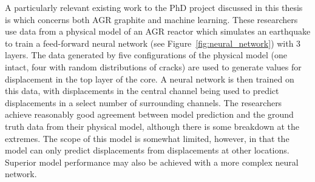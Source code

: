 \noindent
A particularly relevant existing work to the PhD project discussed in this thesis is \cite{dihoru2018neural} which concerns both AGR graphite and machine learning. These researchers use data from a physical model of an AGR reactor which simulates an earthquake to train a feed-forward neural network (see Figure~\ref{fig:neural_network}) with 3 layers. The data generated by five configurations of the physical model (one intact, four with random distributions of cracks) are used to generate values for displacement in the top layer of the core. A neural network is then trained on this data, with displacements in the central channel being used to predict displacements in a select number of surrounding channels. The researchers achieve reasonably good agreement between model prediction and the ground truth data from their physical model, although there is some breakdown at the extremes. The scope of this model is somewhat limited, however, in that the model can only predict displacements from displacements at other locations. Superior model performance may also be achieved with a more complex neural network.  
